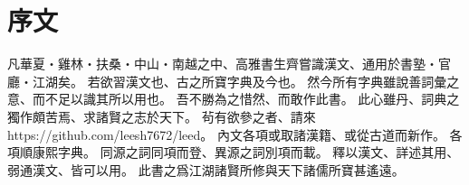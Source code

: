\chapter*{序文}
凡華夏・雞林・扶桑・中山・南越之中、高雅書生齊嘗識漢文、通用於書塾・官廳・江湖矣。
若欲習漢文也、古之所寶字典及今也。
然今所有字典雖說善詞彙之意、而不足以識其所以用也。
吾不勝為之惜然、而敢作此書。
此心雖丹、詞典之獨作頗苦焉、求諸賢之志於天下。
茍有欲參之者、請來 https://github.com/leesh7672/leed。
內文各項或取諸漢籍、或從古道而新作。
各項順康熙字典。
同源之詞同項而登、異源之詞別項而載。
釋以漢文、詳述其用、弱通漢文、皆可以用。
此書之爲江湖諸賢所修與天下諸儒所寶甚遙遠。
